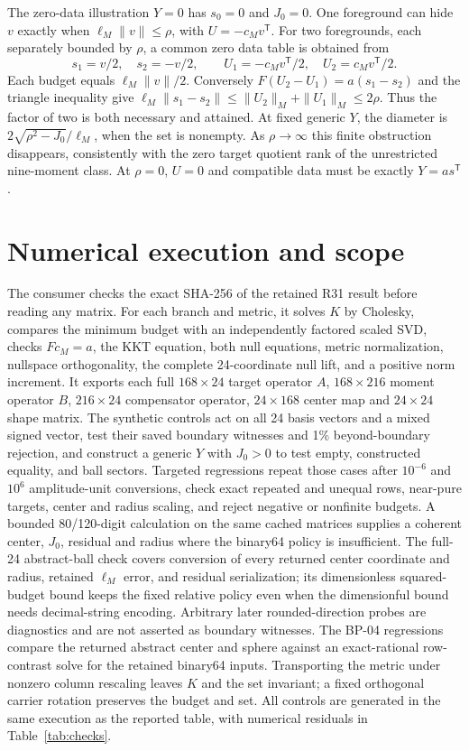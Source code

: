\documentclass[aps,prd,onecolumn,11pt,nofootinbib,notitlepage]{revtex4-2}
\begin{document}
The zero-data illustration $Y=0$ has $s_0=0$ and $J_0=0$. One foreground can hide $v$ exactly when $\ell_M\|v\|\le\rho$, with $U=-c_Mv^{\mathsf T}$. For two foregrounds, each separately bounded by $\rho$, a common zero data table is obtained from
\begin{equation}
 s_1=v/2,\quad s_2=-v/2,\qquad
 U_1=-c_Mv^{\mathsf T}/2,\quad U_2=c_Mv^{\mathsf T}/2.
 \label{eq:pair}
\end{equation}
Each budget equals $\ell_M\|v\|/2$. Conversely $F(U_2-U_1)=a(s_1-s_2)$ and the triangle inequality give $\ell_M\|s_1-s_2\|\le\|U_2\|_M+\|U_1\|_M\le2\rho$. Thus the factor of two is both necessary and attained. At fixed generic $Y$, the diameter is $2\sqrt{\rho^2-J_0}/\ell_M$, when the set is nonempty. As $\rho\to\infty$ this finite obstruction disappears, consistently with the zero target quotient rank of the unrestricted nine-moment class. At $\rho=0$, $U=0$ and compatible data must be exactly $Y=a s^{\mathsf T}$.

\section{Numerical execution and scope}

The consumer checks the exact SHA-256 of the retained R31 result before reading any matrix. For each branch and metric, it solves $K$ by Cholesky, compares the minimum budget with an independently factored scaled SVD, checks $Fc_M=a$, the KKT equation, both null equations, metric normalization, nullspace orthogonality, the complete 24-coordinate null lift, and a positive norm increment. It exports each full $168\times24$ target operator $A$, $168\times216$ moment operator $B$, $216\times24$ compensator operator, $24\times168$ center map and $24\times24$ shape matrix. The synthetic controls act on all 24 basis vectors and a mixed signed vector, test their saved boundary witnesses and 1\% beyond-boundary rejection, and construct a generic $Y$ with $J_0>0$ to test empty, constructed equality, and ball sectors. Targeted regressions repeat those cases after $10^{-6}$ and $10^6$ amplitude-unit conversions, check exact repeated and unequal rows, near-pure targets, center and radius scaling, and reject negative or nonfinite budgets. A bounded 80/120-digit calculation on the same cached matrices supplies a coherent center, $J_0$, residual and radius where the binary64 policy is insufficient. The full-24 abstract-ball check covers conversion of every returned center coordinate and radius, retained $\ell_M$ error, and residual serialization; its dimensionless squared-budget bound keeps the fixed relative policy even when the dimensionful bound needs decimal-string encoding. Arbitrary later rounded-direction probes are diagnostics and are not asserted as boundary witnesses. The BP-04 regressions compare the returned abstract center and sphere against an exact-rational row-contrast solve for the retained binary64 inputs. Transporting the metric under nonzero column rescaling leaves $K$ and the set invariant; a fixed orthogonal carrier rotation preserves the budget and set. All controls are generated in the same execution as the reported table, with numerical residuals in Table~\ref{tab:checks}.
\end{document}
